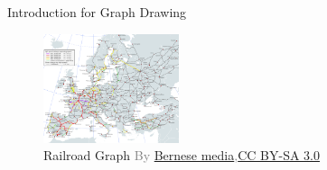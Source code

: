 \documentclass[13pt,aspectratio=169,table,dvipdfmx]{beamer}
\newcommand{\gray}[1]{\textcolor{gray}{#1}}
\begin{document}
\begin{frame}{Introduction for Graph Drawing}
\begin{figure}[htbp]
\begin{minipage}{0.49\columnwidth}
      \caption*{
        Social Network Graph\quad
        \gray{\footnotesize{Designed by \href{www.freepik.com}{Freepik}}}
      }
    \end{minipage}
    \begin{minipage}{0.49\columnwidth}
      \centering
      \includegraphics[height=32mm]{imgs/graph_railway.png}
      \caption*{
        Railroad Graph\quad
        \gray{\footnotesize{By \href{https://commons.wikimedia.org/wiki/File:High_Speed_Railroad_Map_of_Europe.svg}{Bernese media},\href{https://creativecommons.org/licenses/by-sa/3.0}{CC BY-SA 3.0}}}
      }
    \end{minipage}
  \end{figure}
\end{frame}
\end{document}
